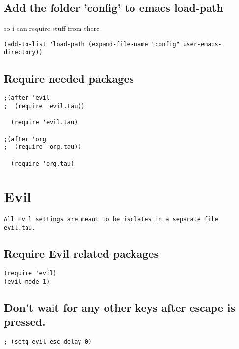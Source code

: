\documentclass[11pt]{article}
\begin{document}
\subsection*{Add the folder 'config' to emacs load-path}
\label{sec:org6b04607}
so i can require stuff from there

\begin{verbatim}
(add-to-list 'load-path (expand-file-name "config" user-emacs-directory))
\end{verbatim}



\subsection*{Require needed packages}
\label{sec:org6f09de3}
\begin{verbatim}
;(after 'evil
;  (require 'evil.tau))

  (require 'evil.tau)

;(after 'org
;  (require 'org.tau))

  (require 'org.tau)

\end{verbatim}


\section*{Evil}
\label{sec:org50ee4b6}

\begin{verbatim}
All Evil settings are meant to be isolates in a separate file evil.tau.
\end{verbatim}

\subsection*{Require Evil related packages}
\label{sec:org5375185}

\begin{verbatim}
(require 'evil)
(evil-mode 1)
\end{verbatim}



\subsection*{Don't wait for any other keys after escape is pressed.}
\label{sec:org12b97f4}
\begin{verbatim}
; (setq evil-esc-delay 0)
\end{verbatim}
\end{document}

